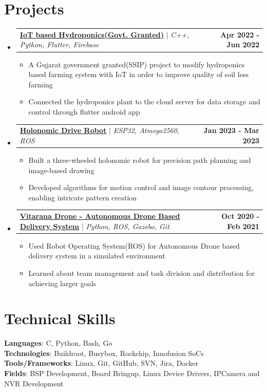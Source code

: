 \documentclass[letterpaper,11pt]{article}
\makeatletter
\newcommand{\resumeItem}[1]{
  \item\small{
    {#1 \vspace{-2pt}}
  }
}
\newcommand{\resumeProjectHeading}[2]{
    \item
    \begin{tabular*}{1.001\textwidth}{l@{\extracolsep{\fill}}r}
      \small#1 & \textbf{\small #2}\\
    \end{tabular*}\vspace{-7pt}
}
\newcommand{\resumeSubHeadingListStart}{\begin{itemize}[leftmargin=0.0in, label={}]}
\newcommand{\resumeSubHeadingListEnd}{\end{itemize}}
\newcommand{\resumeItemListStart}{\begin{itemize}}
\newcommand{\resumeItemListEnd}{\end{itemize}\vspace{-5pt}}
\makeatother
\begin{document}
\section{Projects}
    \vspace{-5pt}
    \resumeSubHeadingListStart
      \resumeProjectHeading
          {\textbf{\href{https://youtu.be/pkwcfo8rbys}{IoT based Hydroponics(Govt. Granted)}} $|$ \emph{C++, Python, Flutter, Firebase}}{Apr 2022 - Jun 2022}
          \resumeItemListStart
            \resumeItem{A Gujarat government granted(SSIP) project to modify hydroponics based farming system with IoT in order to improve quality of soil less farming}
            \resumeItem{Connected the hydroponics plant to the cloud server for data storage and control through flutter android app}
          \resumeItemListEnd
          \vspace{-13pt}
      \resumeProjectHeading
          {\textbf{\href{https://github.com/rishav-singh-0/Holonomic_Art_Bot}{Holonomic Drive Robot}} $|$ \emph{ESP32, Atmega2560, ROS}}{Jan 2023 - Mar 2023}
          \resumeItemListStart
            \resumeItem{Built a three-wheeled holonomic robot for precision path planning and image-based drawing}
            \resumeItem{Developed algorithms for motion control and image contour processing, enabling intricate pattern creation}
          \resumeItemListEnd 
          \vspace{-13pt}
          \resumeProjectHeading
          {\textbf{\href{https://youtube.com/playlist?list=PL7qLGQQRzAKJqw33z4Y1btjFr9WMiOrjP}{Vitarana Drone - Autonomous Drone Based Delivery System}} $|$ \emph{Python, ROS, Gazebo, Git}}{Oct 2020 - Feb 2021}
          \resumeItemListStart
            \resumeItem{Used Robot Operating System(ROS) for Autonomous Drone based delivery system in a simulated environment}
            \resumeItem{Learned about team management and task division and distribution for achieving larger goals}
          \resumeItemListEnd 
    \resumeSubHeadingListEnd
\vspace{-10pt}


\section{Technical Skills}
 \begin{itemize}[leftmargin=0.15in, label={}]
    \small{\item{
     \textbf{Languages}{: C, Python, Bash, Go} \\
     \textbf{Technologies}{: Buildroot, Busybox, Rockchip, Innofusion SoCs} \\
     \textbf{Tools/Frameworks}{: Linux, Git, GitHub, SVN, Jira, Docker} \\
     \textbf{Fields}{: BSP Development, Board Bringup, Linux Device Drivers, IPCamera and NVR Development} \\
    }}
 \end{itemize}
 \vspace{-10pt}
\end{document}
